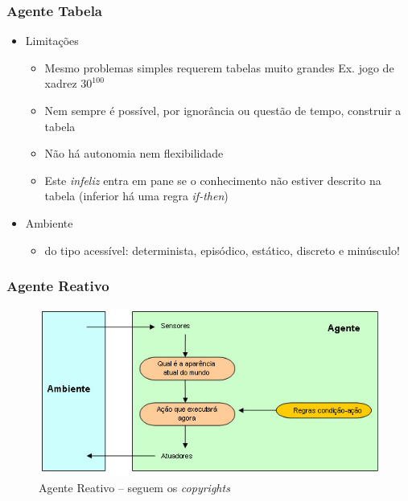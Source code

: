 
\begin{frame} %

    \frametitle{Agente Tabela}

\begin{itemize}
  \item Limitações
  \begin{itemize}
    \item Mesmo problemas simples requerem tabelas muito grandes 
Ex. jogo de xadrez $30^{100}$
    \item Nem sempre é possível, por ignorância ou questão de tempo, construir a tabela 
    \item  Não há autonomia nem flexibilidade
    
    \item Este \textit{infeliz} entra em pane se o conhecimento  não estiver descrito na tabela (inferior há uma regra \textit{if-then})
    
  \end{itemize}
  
  \item Ambiente
\begin{itemize}
  \item do tipo acessível:  determinista, episódico, 
   estático, discreto e minúsculo!
   
\end{itemize}
  
\end{itemize}
\end{frame}



\begin{frame} %

\frametitle{Agente Reativo}

\begin{figure}[!ht]
  \centering
  \includegraphics[height =.6\textheight,width=.7\textwidth]
  {figuras/agente_reativo.jpg}
  \caption{Agente Reativo -- seguem os \textit{copyrights}}
\end{figure}

\end{frame}



